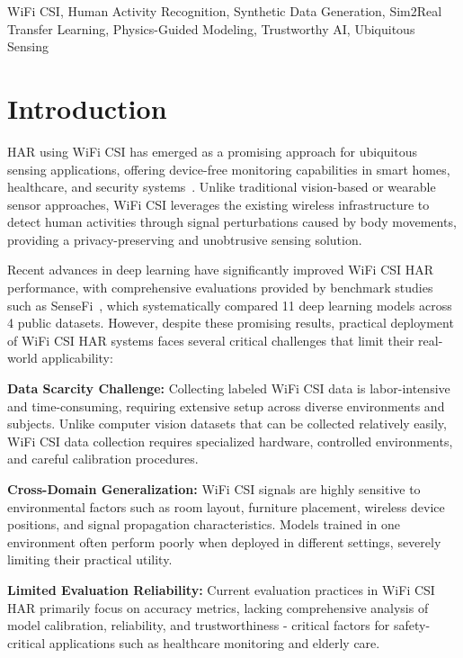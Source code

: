 \documentclass[journal]{IEEEtran}
\begin{document}
\begin{IEEEkeywords}
WiFi CSI, Human Activity Recognition, Synthetic Data Generation, Sim2Real Transfer Learning, Physics-Guided Modeling, Trustworthy AI, Ubiquitous Sensing
\end{IEEEkeywords}

\section{Introduction}


HAR using WiFi CSI has emerged as a promising approach for ubiquitous sensing applications, offering device-free monitoring capabilities in smart homes, healthcare, and security systems~\cite{csi_survey2019}. Unlike traditional vision-based or wearable sensor approaches, WiFi CSI leverages the existing wireless infrastructure to detect human activities through signal perturbations caused by body movements, providing a privacy-preserving and unobtrusive sensing solution.

Recent advances in deep learning have significantly improved WiFi CSI HAR performance, with comprehensive evaluations provided by benchmark studies such as SenseFi~\cite{yang2023sensefi}, which systematically compared 11 deep learning models across 4 public datasets. However, despite these promising results, practical deployment of WiFi CSI HAR systems faces several critical challenges that limit their real-world applicability:

\textbf{Data Scarcity Challenge:} Collecting labeled WiFi CSI data is labor-intensive and time-consuming, requiring extensive setup across diverse environments and subjects. Unlike computer vision datasets that can be collected relatively easily, WiFi CSI data collection requires specialized hardware, controlled environments, and careful calibration procedures.

\textbf{Cross-Domain Generalization:} WiFi CSI signals are highly sensitive to environmental factors such as room layout, furniture placement, wireless device positions, and signal propagation characteristics. Models trained in one environment often perform poorly when deployed in different settings, severely limiting their practical utility.

\textbf{Limited Evaluation Reliability:} Current evaluation practices in WiFi CSI HAR primarily focus on accuracy metrics, lacking comprehensive analysis of model calibration, reliability, and trustworthiness - critical factors for safety-critical applications such as healthcare monitoring and elderly care.
\end{document}
